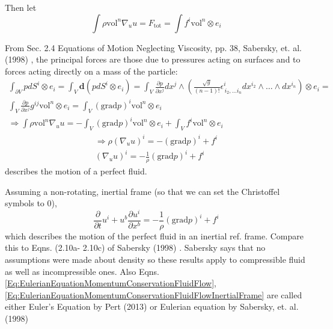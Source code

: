 \documentclass[10pt]{amsart}
\begin{document}
\begin{multicols*}{2}
Then let
\[
\int \rho \text{vol}^n \nabla_u u = F_{\text{tot}}  = \int f^i \text{vol}^n \otimes e_i
\]

From Sec. 2.4 Equations of Motion Neglecting Viscosity, pp. 38, Sabersky, et. al. (1998) \cite{SAHG1998}, the principal forces are those due to pressures acting on surfaces and to forces acting directly on a mass of the particle:
\[
\begin{gathered}
\int_{\partial V} p dS^i \otimes e_i = \int_V \mathbf{d} (pdS^i \otimes e_i) = \int_V \frac{\partial p}{\partial x^j} dx^j \wedge \left( \frac{\sqrt{g}}{(n-1)!} \epsilon^i_{\, i_2, \dots i_n} dx^{i_2} \wedge \dots \wedge dx^{i_n} \right) \otimes e_i = \\
\int_V \frac{\partial p}{\partial x^j} g^{ij} \text{vol}^n \otimes e_i = \int_V (\text{grad}p)^i \text{vol}^n \otimes e_i \\
\Longrightarrow \int \rho \text{vol}^n \nabla_u u = -\int_V (\text{grad}p)^i \text{vol}^n \otimes e_i + \int_V f^i \text{vol}^n \otimes e_i
\end{gathered}
\]
\begin{equation}\label{Eq:EulerianEquationMomentumConservationFluidFlow}
\begin{gathered}
\Longrightarrow \rho (\nabla_u u)^i = -(\text{grad}p)^i + f^i \\
(\nabla_u u)^i = -\frac{1}{\rho} (\text{grad}p)^i + f^i
\end{gathered}
\end{equation}
describes the motion of a perfect fluid.

Assuming a non-rotating, inertial frame (so that we can set the Christoffel symbols to 0),
\begin{equation}\label{Eq:EulerianEquationMomentumConservationFluidFlowInertialFrame}
\frac{\partial}{\partial t} u^i + u^b \frac{\partial u^i}{\partial x^b} = - \frac{1}{\rho}(\text{grad}p)^i + f^i
\end{equation}
which describes the motion of the perfect fluid in an inertial ref. frame. Compare this to Eqns. (2.10a- 2.10c) of Sabersky (1998) \cite{SAHG1998}. Sabersky says that no assumptions were made about density so these results apply to compressible fluid as well as incompressible ones. Also Eqns. \ref{Eq:EulerianEquationMomentumConservationFluidFlow}, \ref{Eq:EulerianEquationMomentumConservationFluidFlowInertialFrame} are called either Euler's Equation by Pert (2013) \cite{Pert2013} or Eulerian equation by Sabersky, et. al. (1998) \cite{SAHG1998}




\end{multicols*}
\end{document}
